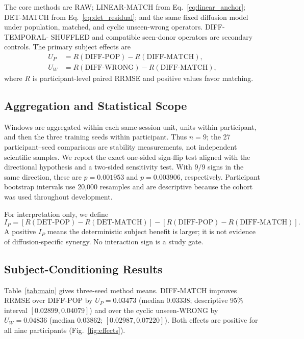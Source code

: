 The core methods are RAW; LINEAR-MATCH from Eq.~\eqref{eq:linear_anchor};
DET-MATCH from Eq.~\eqref{eq:det_residual}; and the same fixed diffusion model
under population, matched, and cyclic unseen-wrong operators. DIFF-TEMPORAL-
SHUFFLED and compatible seen-donor operators are secondary controls. The primary
subject effects are
\begin{align}
 U_P&=R(\mathrm{DIFF\mbox{-}POP})-R(\mathrm{DIFF\mbox{-}MATCH}),\\
 U_W&=R(\mathrm{DIFF\mbox{-}WRONG})-R(\mathrm{DIFF\mbox{-}MATCH}),
\end{align}
where $R$ is participant-level paired RRMSE and positive values favor matching.

\subsection{Aggregation and Statistical Scope}
Windows are aggregated within each same-session unit, units within participant,
and then the three training seeds within participant. Thus $n=9$; the 27
participant--seed comparisons are stability measurements, not independent
scientific samples. We report the exact one-sided sign-flip test aligned with
the directional hypothesis and a two-sided sensitivity test. With 9/9 signs in
the same direction, these are $p=0.001953$ and $p=0.003906$, respectively.
Participant bootstrap intervals use 20,000 resamples and are descriptive because
the cohort was used throughout development.

For interpretation only, we define
\begin{equation}
 I_P=[R(\mathrm{DET\mbox{-}POP})-R(\mathrm{DET\mbox{-}MATCH})]
 -[R(\mathrm{DIFF\mbox{-}POP})-R(\mathrm{DIFF\mbox{-}MATCH})].
\end{equation}
A positive $I_P$ means the deterministic subject benefit is larger; it is not
evidence of diffusion-specific synergy. No interaction sign is a study gate.

\subsection{Subject-Conditioning Results}
Table~\ref{tab:main} gives three-seed method means. DIFF-MATCH improves RRMSE
over DIFF-POP by $U_P=0.03473$ (median $0.03338$; descriptive 95\% interval
$[0.02899,0.04079]$) and over the cyclic unseen-WRONG by $U_W=0.04836$
(median $0.03862$; $[0.02987,0.07220]$). Both effects are positive for all nine
participants (Fig.~\ref{fig:effects}).

